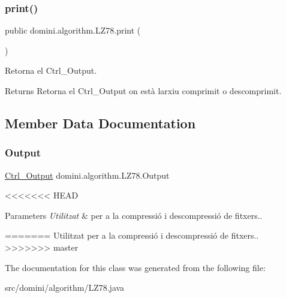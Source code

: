 \subsubsection{\texorpdfstring{print()}{print()}}
{\footnotesize\ttfamily public domini.\+algorithm.\+L\+Z78.\+print (\begin{DoxyParamCaption}{ }\end{DoxyParamCaption})\hspace{0.3cm}{\ttfamily [inline]}}



Retorna el Ctrl\+\_\+\+Output. 

\begin{DoxyReturn}{Returns}
Retorna el Ctrl\+\_\+\+Output on està l\textquotesingle{}arxiu comprimit o descomprimit. 
\end{DoxyReturn}


\subsection{Member Data Documentation}
\mbox{\label{classdomini_1_1algorithm_1_1LZ78_a6cb1fa950644b379cc4034437047ccb8}} 
\subsubsection{\texorpdfstring{Output}{Output}}
{\footnotesize\ttfamily \hyperlink{classpersistencia_1_1output_1_1Ctrl__Output}{Ctrl\+\_\+\+Output} domini.\+algorithm.\+L\+Z78.\+Output\hspace{0.3cm}{\ttfamily [package]}}

<<<<<<< HEAD

\begin{DoxyParams}{Parameters}
{\em Utilitzat} & per a la compressió i descompressió de fitxers.. \\
\hline
\end{DoxyParams}

=======
Utilitzat per a la compressió i descompressió de fitxers.. 
>>>>>>> master

The documentation for this class was generated from the following file\+:\begin{DoxyCompactItemize}
\item 
src/domini/algorithm/L\+Z78.\+java\end{DoxyCompactItemize}
